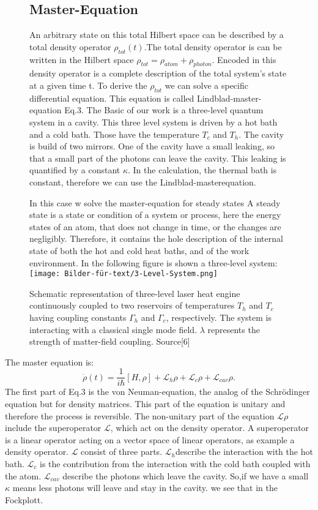 \documentclass[12pt,a4paper]{article}
\begin{document}
\begin{figure}[h!]
\newpage
\newpage 
\subsection{Master-Equation} 
An arbitrary state on this total
Hilbert space can be described by a total density operator $\rho_{tot}(t)$.The total density operator is  can be written in the Hilbert space $ \rho_ {tot}= \rho_{atom}+\rho_{photon}$.  Encoded in this density
operator is a complete description of the total system's state at a given time t. To derive the $\rho_{tot}$ we can solve a specific differential equation. This equation is called Lindblad-master-equation Eq.3. 
The Basic of our work is a three-level quantum system in a cavity. This three level system is driven by a hot bath and a cold bath. Those have the temperature $T_c$ and $T_h$. The cavity is build of two mirrors. One of the cavity have a small leaking, so that a small part of the photons can leave the cavity. This leaking is quantified by a constant $\kappa$.
In the calculation, the thermal bath is constant, therefore 
we can use the Lindblad-masterequation. 

In this case w solve the master-equation for steady states
A steady state is a state or condition of a system or process, here the energy states of an atom, that does not change in time, or the changes are negligibly.
Therefore, it contains the hole description of the internal state of both the hot and cold heat baths,
and of the work environment.
In the following figure is shown a three-level system:
\newpage
\texttt{[image: Bilder-für-text/3-Level-System.png]}
\caption{Schematic representation of three-level laser heat engine
continuously coupled to two reservoirs of temperatures $T_h$ and
$T_c$ having coupling constants $\Gamma_h$ and $\Gamma_c$, respectively. The
system is interacting with a classical single mode field. $\lambda$
represents the strength of matter-field coupling. Source[6]}
\end{figure}

The master equation is:
\begin{equation}
\dot{\rho}(t)=\frac{1}{i \hbar}[H,\rho]+ \mathcal{L}_{h}\rho+ \mathcal{L}_{c}\rho+ \mathcal{L}_{cav}\rho.
\end{equation}
The first part of Eq.3 is the von Neuman-equation,  the analog of the Schrödinger equation but for density matrices. This part of the equation is unitary and therefore the process is reversible.
The non-unitary part of the equation $\mathcal{L}\rho$ include the superoperator $\mathcal{L}$, which act on the density operator.  A superoperator is a linear operator acting on a vector space of linear operators, as example a density operator.
$\mathcal{L}$ consist of three parts. $\mathcal{L}_h$describe the interaction with the hot bath.
$\mathcal{L}_c$ is the contribution from the interaction with the cold bath coupled with the atom.
$\mathcal{L}_{cav}$ describe the photons which leave the cavity. So,if we have a small $\kappa$ means less photons will leave and stay in the cavity. we see that in the Fockplott.
\end{document}
